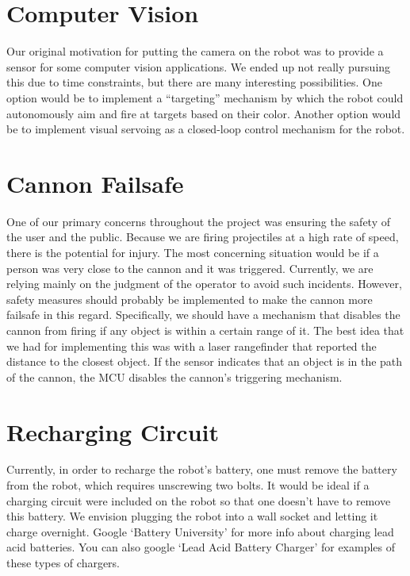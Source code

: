 \documentclass[letterpaper,12pt]{report}
\begin{document}
\section{Computer Vision}
Our original motivation for putting the camera on the robot was to provide a
sensor for some computer vision applications. We ended up not really pursuing
this due to time constraints, but there are many interesting possibilities. One
option would be to implement a ``targeting'' mechanism by which the robot could
autonomously aim and fire at targets based on their color. Another option would
be to implement visual servoing as a closed-loop control mechanism for the
robot.

\section{Cannon Failsafe}
One of our primary concerns throughout the project was ensuring the safety of
the user and the public. Because we are firing projectiles at a high rate of
speed, there is the potential for injury. The most concerning situation would be
if a person was very close to the cannon and it was triggered. Currently, we are
relying mainly on the judgment of the operator to avoid such incidents. However,
safety measures should probably be implemented to make the cannon more failsafe
in this regard. Specifically, we should have a mechanism that disables the
cannon from firing if any object is within a certain range of it. The best idea
that we had for implementing this was with a laser rangefinder that reported the
distance to the closest object. If the sensor indicates that an object is in the
path of the cannon, the MCU disables the cannon's triggering mechanism.

\section{Recharging Circuit}
Currently, in order to recharge the robot's battery, one must remove the
battery from the robot, which requires unscrewing two bolts. It would be ideal
if a charging circuit were included on the robot so that one doesn't have to
remove this battery. We envision plugging the robot into a wall socket and
letting it charge overnight. Google `Battery University' for more info about
charging lead acid batteries. You can also google `Lead Acid Battery Charger'
for examples of these types of chargers.
\end{document}
